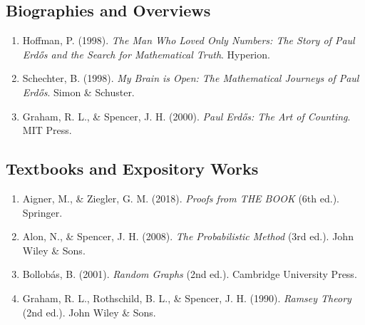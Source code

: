 \subsection*{Biographies and Overviews}
\begin{enumerate}
    \item Hoffman, P. (1998). \textit{The Man Who Loved Only Numbers: The Story of Paul Erd\H{o}s and the Search for Mathematical Truth}. Hyperion.
    \item Schechter, B. (1998). \textit{My Brain is Open: The Mathematical Journeys of Paul Erd\H{o}s}. Simon \& Schuster.
    \item Graham, R. L., \& Spencer, J. H. (2000). \textit{Paul Erd\H{o}s: The Art of Counting}. MIT Press.
\end{enumerate}

\subsection*{Textbooks and Expository Works}
\begin{enumerate}
    \item Aigner, M., \& Ziegler, G. M. (2018). \textit{Proofs from THE BOOK} (6th ed.). Springer.
    \item Alon, N., \& Spencer, J. H. (2008). \textit{The Probabilistic Method} (3rd ed.). John Wiley \& Sons.
    \item Bollob\'{a}s, B. (2001). \textit{Random Graphs} (2nd ed.). Cambridge University Press.
    \item Graham, R. L., Rothschild, B. L., \& Spencer, J. H. (1990). \textit{Ramsey Theory} (2nd ed.). John Wiley \& Sons.
\end{enumerate}
